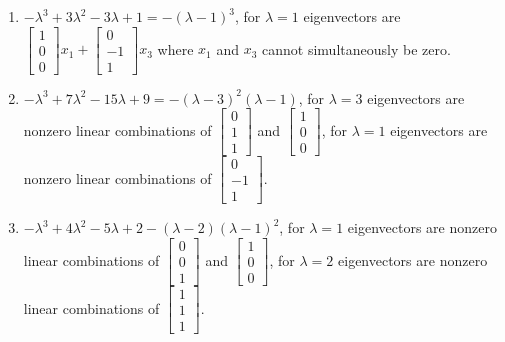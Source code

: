 \begin{multicols}{2}
\begin{enumerate}
\begin{enumerate}
	\item 
$-\lambda ^3+3 \lambda ^2-3 \lambda +1=
-(\lambda -1)^3$,
for 
$\lambda=1$
eigenvectors are
$\begin{bmatrix}1\\ 0\\ 0\end{bmatrix}x_1+\begin{bmatrix}0\\ -1\\ 1\end{bmatrix}x_3$ where $x_1$ and $x_3$ cannot simultaneously be zero.


	\item 
$-\lambda ^3+7 \lambda ^2-15 \lambda +9=
-(\lambda -3)^2 (\lambda -1)$,
for 
$\lambda=3$
eigenvectors are nonzero linear combinations of
$\begin{bmatrix}0\\ 1\\ 1\end{bmatrix}$ and $\begin{bmatrix}1\\ 0\\ 0\end{bmatrix}$,
for 
$\lambda=1$
eigenvectors are nonzero linear combinations of
$\begin{bmatrix}0\\ -1\\ 1\end{bmatrix}$.


	\item 
$-\lambda ^3+4 \lambda ^2-5 \lambda +2
-(\lambda -2) (\lambda -1)^2$,
for 
$\lambda=1$
eigenvectors are nonzero linear combinations of
$\begin{bmatrix}0\\ 0\\ 1\end{bmatrix}$ and $\begin{bmatrix}1\\ 0\\ 0\end{bmatrix}$,
for 
$\lambda=2$
eigenvectors are nonzero linear combinations of
$\begin{bmatrix}1\\ 1\\ 1\end{bmatrix}$.


\end{enumerate}


\end{enumerate}
\end{multicols}



